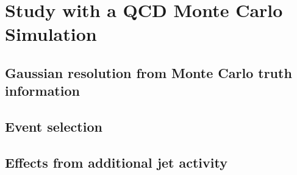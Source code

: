 

\section{Study with a QCD Monte Carlo Simulation}


\subsection{Gaussian resolution from Monte Carlo truth information}


\subsection{Event selection}


\subsection{Effects from additional jet activity}
